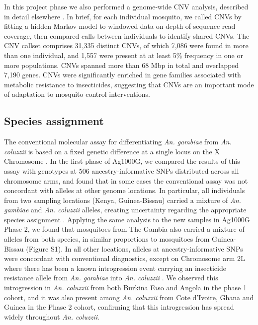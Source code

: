 \documentclass[a4paper,11pt,abstracton,hidelinks]{scrartcl}
\begin{document}
In this project phase we also performed a genome-wide CNV analysis, described in detail elsewhere \cite{lucas2019}.
%
In brief, for each individual mosquito, we called CNVs by fitting a hidden Markov model to windowed data on depth of sequence read coverage, then compared calls between individuals to identify shared CNVs.
%
The CNV callset comprises 31,335 distinct CNVs, of which 7,086 were found in more than one individual, and 1,557 were present at at least 5\% frequency in one or more populations.
%
CNVs spanned more than 68 Mbp in total and overlapped 7,190 genes.
%
CNVs were significantly enriched in gene families associated with metabolic resistance to insecticides, suggesting that CNVs are an important mode of adaptation to mosquito control interventions.


\subsection*{Species assignment}


%
The conventional molecular assay for differentiating \textit{An. gambiae} from \textit{An. coluzzii} is based on a fixed genetic difference at a single locus on the X Chromosome \cite{santolamazza2008}.
%
In the first phase of Ag1000G, we compared the results of this assay with genotypes at 506 ancestry-informative SNPs distributed across all chromosome arms, and found that in some cases the conventional assay was not concordant with alleles at other genome locations.
%
In particular, all individuals from two sampling locations (Kenya, Guinea-Bissau) carried a mixture of \textit{An. gambiae} and \textit{An. coluzzii} alleles, creating uncertainty regarding the appropriate species assignment \cite{Ag1000gConsortium2017}. 
%
Applying the same analysis to the new samples in Ag1000G Phase 2, we found that mosquitoes from The Gambia also carried a mixture of alleles from both species, in similar proportions to mosquitoes from Guinea-Bissau (Figure S1).
%
In all other locations, alleles at ancestry-informative SNPs were concordant with conventional diagnostics, except on Chromosome arm 2L where there has been a known introgression event carrying an insecticide resistance allele from \textit{An. gambiae} into \textit{An. coluzzii} \cite{weill2000, diabate2004, clarkson2014, norris2015}.
%
We observed this introgression in \textit{An. coluzzii} from both Burkina Faso and Angola in the phase 1 cohort, and it was also present among \textit{An. coluzzii} from Cote d'Ivoire, Ghana and Guinea in the Phase 2 cohort, confirming that this introgression has spread widely throughout \textit{An. coluzzii}.
\end{document}
